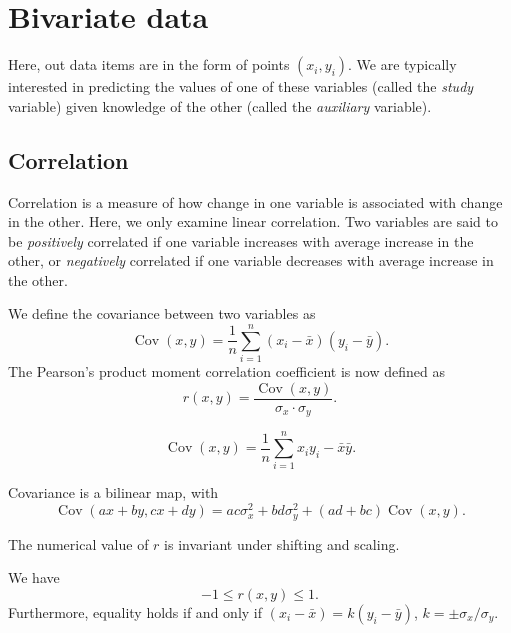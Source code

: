 \documentclass[11pt]{article}
\DeclareMathOperator{\cov}{Cov}
\theoremstyle{definition}
\theoremstyle{remark}
\numberwithin{equation}{section}
\begin{document}
    
    \section{Bivariate data}
    
    Here, out data items are in the form of points $(x_i, y_i)$. We are typically
    interested in predicting the values of one of these variables (called the
    \emph{study} variable) given knowledge of the other (called the \emph{auxiliary}
    variable).


    \subsection{Correlation}
    Correlation is a measure of how change in one variable is associated with change
    in the other. Here, we only examine linear correlation. Two variables are said to
    be \emph{positively} correlated if one variable increases with average increase
    in the other, or \emph{negatively} correlated if one variable decreases with
    average increase in the other.

    We define the covariance between two variables as \[
        \cov(x, y) = \frac{1}{n}\sum_{i = 1}^n (x_i - \bar{x})(y_i - \bar{y}).
    \] The Pearson's product moment correlation coefficient is now defined as \[
        r(x, y) = \frac{\cov(x, y)}{\sigma_x\cdot \sigma_y}.
    \]

    \begin{lemma}
        \[
            \cov(x, y) = \frac{1}{n}\sum_{i = 1}^n x_iy_i - \bar{x}\bar{y}.
        \] 
    \end{lemma}

    \begin{lemma}
        Covariance is a bilinear map, with \[
            \cov(ax + by, cx + dy) = ac\sigma_x^2 + bd\sigma_y^2 + (ad + bc)\cov(x,
            y).
        \]
    \end{lemma}

    \begin{lemma}
        The numerical value of $r$ is invariant under shifting and scaling.
    \end{lemma}
    
    \begin{lemma}
        We have \[
            -1 \leq r(x, y) \leq 1.
        \] Furthermore, equality holds if and only if $(x_i - \bar{x}) = k(y_i -
        \bar{y})$, $k = \pm \sigma_x / \sigma_y$.
    \end{lemma}
\end{document}
